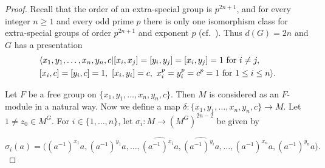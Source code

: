 \documentclass[preprint,sort&compress,12pt]{elsarticle}
\theoremstyle{definition}
\numberwithin{equation}{theorem}
\begin{document}
\begin{proof}
Recall that the order of an extra-special group is $p^{2n+1}$, and for every integer $n\ge 1$ and every odd prime $p$ there is only one isomorphism class for extra-special groups of order $p^{2n+1}$ and exponent $p$ (cf.\ \cite[p.\ 34]{GM}). Thus $d(G)=2n$ and $G$ has a presentation
\begin{align}
\notag & \langle x_1, y_1, \ldots, x_n, y_n, c| [x_i, x_j] = [y_i, y_j]= [x_i, y_j]=1\ \text{for}\ i\neq j,\\
\label{eq:2.2.1}& [x_i, c]= [y_i, c]=1,\ [x_i, y_i]=c,\ x_i^p= y_i^p= c^p=1\ \text{for}\ 1\le i\le n\rangle.
\end{align}

\noindent Let $F$ be a free group on $\{x_1, y_1, \ldots, x_n, y_n, c\}$. Then $M$ is considered as an $F$-module in a natural way. Now we define a map $\delta :\{x_1, y_1, \ldots, x_n, y_n, c\}\rightarrow M$. Let $1\neq z_0\in M^G$. For $i\in \{1, \ldots, n\}$, let $\sigma_i:M\rightarrow (M^G)^{2n-2}$ be given by

\begin{equation*}
\sigma_i(a)= \big((a^{-1})^{x_1}a, (a^{-1})^{y_1}a, \ldots, \widehat{(a^{-1})^{x_i}a}, \widehat{(a^{-1})^{y_i}a}, \ldots, (a^{-1})^{x_n}a, (a^{-1})^{y_n}a\big).
\end{equation*}


\end{proof}
\end{document}
